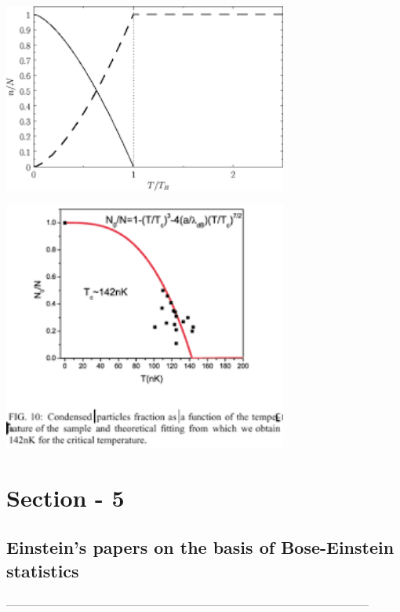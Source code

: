 \documentclass[12pt, letterpaper]{article}
\begin{document}
    \begin{adjustbox}{center,caption={},label={somelabel},nofloat=figure,vspace=\bigskipamount}
        \includegraphics[width=0.7\textwidth]{fig6}
    \end{adjustbox}

    \begin{adjustbox}{center,caption={Bose Einstein Condensation graph},label={somelabel},nofloat=figure,vspace=\bigskipamount}
        \includegraphics[width=0.7\textwidth]{fig7}
    \end{adjustbox}
    \newpage
    \section*{Section - 5}
    \subsection*{Einstein's papers on the basis of Bose-Einstein statistics}
    \noindent
    --------------------------------------------------------------------------------------------------- \\ 
    \\
    \\
    \\
\end{document}
